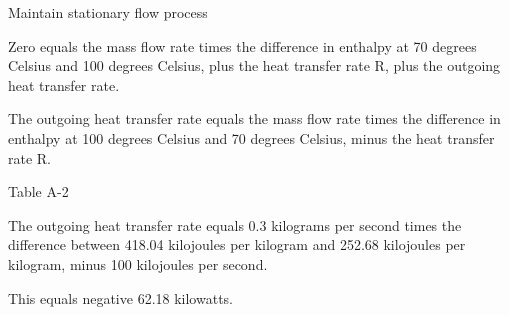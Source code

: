 Maintain stationary flow process

Zero equals the mass flow rate times the difference in enthalpy at 70 degrees Celsius and 100 degrees Celsius, plus the heat transfer rate R, plus the outgoing heat transfer rate.

The outgoing heat transfer rate equals the mass flow rate times the difference in enthalpy at 100 degrees Celsius and 70 degrees Celsius, minus the heat transfer rate R.

Table A-2

The outgoing heat transfer rate equals 0.3 kilograms per second times the difference between 418.04 kilojoules per kilogram and 252.68 kilojoules per kilogram, minus 100 kilojoules per second.

This equals negative 62.18 kilowatts.